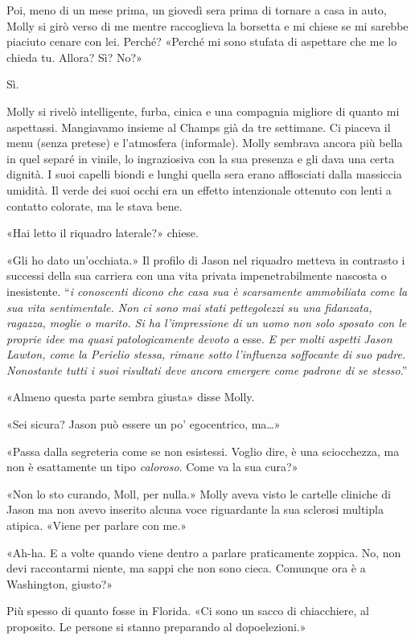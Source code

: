 Poi, meno di un mese prima, un giovedì sera prima di tornare a casa in
auto, Molly si girò verso di me mentre raccoglieva la borsetta e mi
chiese se mi sarebbe piaciuto cenare con lei. Perché? «Perché mi sono
stufata di aspettare che me lo chieda tu. Allora? Sì? No?»

Sì.

Molly si rivelò intelligente, furba, cinica e una compagnia migliore di
quanto mi aspettassi. Mangiavamo insieme al Champs già da tre settimane.
Ci piaceva il menu (senza pretese) e l'atmosfera (informale). Molly
sembrava ancora più bella in quel separé in vinile, lo ingraziosiva con
la sua presenza e gli dava una certa dignità. I suoi capelli biondi e
lunghi quella sera erano afflosciati dalla massiccia umidità. Il verde
dei suoi occhi era un effetto intenzionale ottenuto con lenti a contatto
colorate, ma le stava bene.

«Hai letto il riquadro laterale?» chiese.

«Gli ho dato un'occhiata.» Il profilo di Jason nel riquadro metteva in
contrasto i successi della sua carriera con una vita privata
impenetrabilmente nascosta o inesistente. ``\emph{i conoscenti dicono
	che casa sua è scarsamente ammobiliata come la sua vita sentimentale.
	Non ci sono mai stati pettegolezzi su una fidanzata, ragazza, moglie o
	marito. Si ha l'impressione di un uomo non solo sposato con le proprie
	idee ma quasi patologicamente devoto a} esse. \emph{E per molti aspetti
	Jason Lawton, come la Perielio stessa, rimane sotto l'influenza
	soffocante di suo padre. Nonostante tutti i suoi risultati deve ancora
	emergere come padrone di se stesso}.''

«Almeno questa parte sembra giusta» disse Molly.

«Sei sicura? Jason può essere un po' egocentrico, ma\ldots»

«Passa dalla segreteria come se non esistessi. Voglio dire, è una
sciocchezza, ma non è esattamente un tipo \emph{caloroso}. Come va la
sua cura?»

«Non lo sto curando, Moll, per nulla.» Molly aveva visto le cartelle
cliniche di Jason ma non avevo inserito alcuna voce riguardante la sua
sclerosi multipla atipica. «Viene per parlare con me.»

«Ah-ha. E a volte quando viene dentro a parlare praticamente zoppica.
No, non devi raccontarmi niente, ma sappi che non sono cieca. Comunque
ora è a Washington, giusto?»

Più spesso di quanto fosse in Florida. «Ci sono un sacco di chiacchiere,
al proposito. Le persone si stanno preparando al dopoelezioni.»

